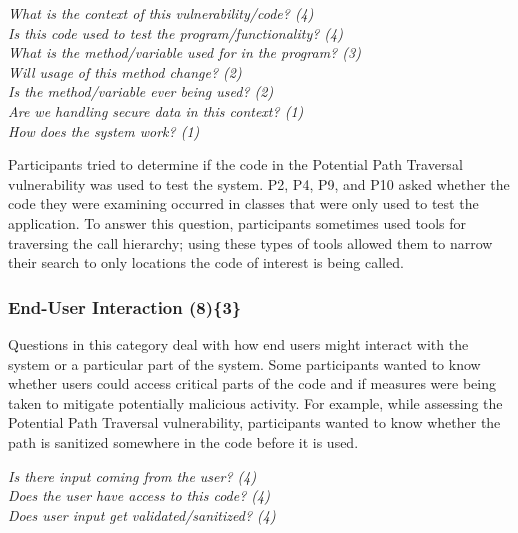 \documentclass{acm_proc_article-sp}
\begin{document}
\noindent\emph{What is the context of this vulnerability/code? (4)} \\
\emph{Is this code used to test the program/functionality? (4)} \\
\emph{What is the method/variable used for in the program? (3)} \\
\emph{Will usage of this method change? (2)} \\
\emph{Is the method/variable ever being used? (2)} \\
\emph{Are we handling secure data in this context? (1)} \\
\emph{How does the system work? (1)} 



Participants tried to determine if the code in the Potential Path Traversal vulnerability was used to test the system. 
P2, P4, P9, and P10 asked whether the code they were examining occurred in classes that were only used to test the application. 
To answer this question, participants sometimes used tools for traversing the call hierarchy; using these types of tools allowed them to narrow their search to only locations the code of interest is being called.




\subsubsection{\textbf{End-User Interaction (8)\{3\}}}
\label{eui}

Questions in this category deal with how end users might interact with the system or a particular part of the system. 
Some participants wanted to know whether users could access critical parts of the code and if measures were being taken to mitigate potentially malicious activity. 
For example, while assessing the Potential Path Traversal vulnerability, participants wanted to know whether the path is sanitized somewhere in the code before it is used.


\noindent\emph{Is there input coming from the user? (4)} \\
\emph{Does the user have access to this code? (4)} \\
\emph{Does user input get validated/sanitized? (4)} 
\end{document}
